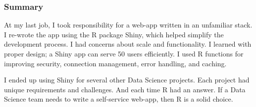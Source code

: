 \documentclass[]{article}
\newenvironment{Shaded}{\begin{snugshade}}{\end{snugshade}}
\newcommand{\ControlFlowTok}[1]{\textcolor[rgb]{0.13,0.29,0.53}{\textbf{#1}}}
\newcommand{\DataTypeTok}[1]{\textcolor[rgb]{0.13,0.29,0.53}{#1}}
\newcommand{\KeywordTok}[1]{\textcolor[rgb]{0.13,0.29,0.53}{\textbf{#1}}}
\newcommand{\NormalTok}[1]{#1}
\newcommand{\OperatorTok}[1]{\textcolor[rgb]{0.81,0.36,0.00}{\textbf{#1}}}
\newcommand{\StringTok}[1]{\textcolor[rgb]{0.31,0.60,0.02}{#1}}
\begin{document}
\begin{Shaded}
\end{Shaded}

\hypertarget{summary}{%
\subsubsection{Summary}\label{summary}}

At my last job, I took responsibility for a web-app written in an
unfamiliar stack. I re-wrote the app using the R package Shiny, which
helped simplify the development process. I had concerns about scale and
functionality. I learned with proper design; a Shiny app can serve 50
users efficiently. I used R functions for improving security, connection
management, error handling, and caching.

I ended up using Shiny for several other Data Science projects. Each
project had unique requirements and challenges. And each time R had an
answer. If a Data Science team needs to write a self-service web-app,
then R is a solid choice.
\end{document}

